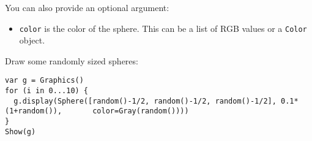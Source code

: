 You can also provide an optional argument:

\begin{itemize}

\item
  \texttt{color} is the color of the sphere. This can be a list of RGB
  values or a \texttt{Color} object.
\end{itemize}

Draw some randomly sized spheres:

\begin{lstlisting}
var g = Graphics()
for (i in 0...10) {
  g.display(Sphere([random()-1/2, random()-1/2, random()-1/2], 0.1*(1+random()),       color=Gray(random())))
}
Show(g)
\end{lstlisting}
